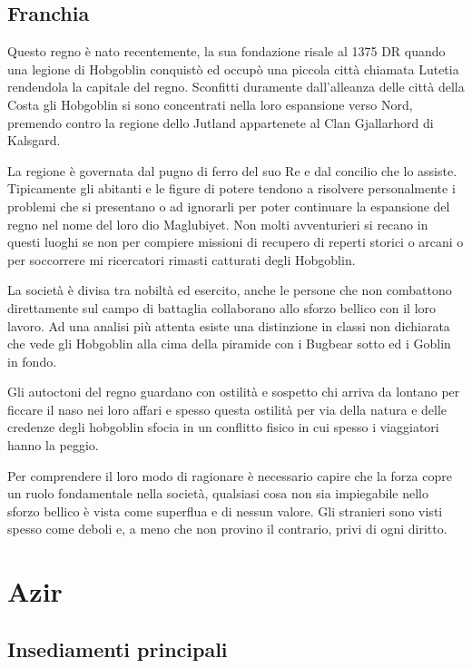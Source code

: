 \documentclass[letterpaper,twocolumn,openany,nodeprecatedcode]{dndbook}
\begin{document}
\section{Franchia}
Questo regno è nato recentemente, la sua fondazione risale al 1375 DR quando una legione di Hobgoblin conquistò ed occupò una piccola città chiamata Lutetia rendendola la capitale del regno. Sconfitti duramente dall'alleanza delle città della Costa gli Hobgoblin si sono concentrati nella loro espansione verso Nord, premendo contro la regione dello Jutland appartenete al Clan Gjallarhord di Kalsgard.

La regione è governata dal pugno di ferro del suo Re e dal concilio che lo assiste. Tipicamente gli abitanti e le figure di potere tendono a risolvere personalmente i problemi che si presentano o ad ignorarli per poter continuare la espansione del regno nel nome del loro dio Maglubiyet. Non molti avventurieri si recano in questi luoghi se non per compiere missioni di recupero di reperti storici o arcani o per soccorrere mi ricercatori rimasti catturati degli Hobgoblin.

La società è divisa tra nobiltà ed esercito, anche le persone che non combattono direttamente sul campo di battaglia collaborano allo sforzo bellico con il loro lavoro. Ad una analisi più attenta esiste una distinzione in classi non dichiarata che vede gli Hobgoblin alla cima della piramide con i Bugbear sotto ed i Goblin in fondo.

Gli autoctoni del regno guardano con ostilità e sospetto chi arriva da lontano per ficcare il naso nei loro affari e spesso questa ostilità per via della natura e delle credenze degli hobgoblin sfocia in un conflitto fisico in cui spesso i viaggiatori hanno la peggio. 

Per comprendere il loro modo di ragionare è necessario capire che la forza copre un ruolo fondamentale nella società, qualsiasi cosa non sia impiegabile nello sforzo bellico è vista come superflua e di nessun valore. Gli stranieri sono visti spesso come deboli e, a meno che non provino il contrario, privi di ogni diritto.

\chapter{Azir}

\section{Insediamenti principali}
\end{document}
